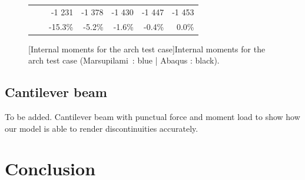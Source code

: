 \begin{figure}[p]
\begin{fullpage}
\begin{tabularx}{0.65\textwidth}{@{} XX rrrrr@{}}
&&{\color{black}\normalsize-1 231}&{\color{black}\normalsize-1 378}&{\color{black}\normalsize-1 430}&{\color{black}\normalsize-1 447}&{\color{black}\normalsize-1 453}\\
&&{\color{black}\scriptsize-15.3\%}&{\color{black}\scriptsize-5.2\%}&{\color{black}\scriptsize-1.6\%}&{\color{black}\scriptsize-0.4\%}&{\color{black}\scriptsize0.0\%}\\\bottomrule
\end{tabularx}
[Internal moments for the arch test case]{Internal moments for the arch test case (Marsupilami~: blue | Abaqus : black).}
\label{tab:resA_moment}
	\end{fullpage}
\end{figure}
\clearpage
\subsection{Cantilever beam}
To be added. Cantilever beam with punctual force and moment load to show how our model is able to render discontinuities accurately.

\section{Conclusion}


